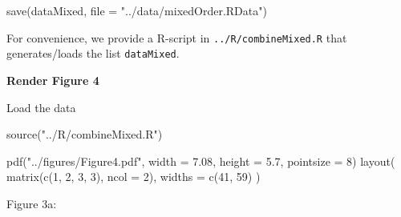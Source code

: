\documentclass[
]{article}
\newenvironment{Shaded}{\begin{snugshade}}{\end{snugshade}}
\newcommand{\AttributeTok}[1]{\textcolor[rgb]{0.77,0.63,0.00}{#1}}
\newcommand{\DecValTok}[1]{\textcolor[rgb]{0.00,0.00,0.81}{#1}}
\newcommand{\FloatTok}[1]{\textcolor[rgb]{0.00,0.00,0.81}{#1}}
\newcommand{\FunctionTok}[1]{\textcolor[rgb]{0.00,0.00,0.00}{#1}}
\newcommand{\NormalTok}[1]{#1}
\newcommand{\StringTok}[1]{\textcolor[rgb]{0.31,0.60,0.02}{#1}}
\begin{document}
\begin{Shaded}
\begin{Highlighting}[]
\FunctionTok{save}\NormalTok{(dataMixed, }\AttributeTok{file =} \StringTok{"../data/mixedOrder.RData"}\NormalTok{)}
\end{Highlighting}
\end{Shaded}

For convenience, we provide a R-script in \texttt{../R/combineMixed.R}
that generates/loads the list \texttt{dataMixed}.

\textbf{Render Figure 4}

Load the data

\begin{Shaded}
\begin{Highlighting}[]
\FunctionTok{source}\NormalTok{(}\StringTok{"../R/combineMixed.R"}\NormalTok{)}
\end{Highlighting}
\end{Shaded}

\begin{Shaded}
\begin{Highlighting}[]
\FunctionTok{pdf}\NormalTok{(}\StringTok{"../figures/Figure4.pdf"}\NormalTok{, }\AttributeTok{width =} \FloatTok{7.08}\NormalTok{, }\AttributeTok{height =} \FloatTok{5.7}\NormalTok{, }\AttributeTok{pointsize =} \DecValTok{8}\NormalTok{)}
\FunctionTok{layout}\NormalTok{(}
  \FunctionTok{matrix}\NormalTok{(}\FunctionTok{c}\NormalTok{(}\DecValTok{1}\NormalTok{, }\DecValTok{2}\NormalTok{, }\DecValTok{3}\NormalTok{, }\DecValTok{3}\NormalTok{), }\AttributeTok{ncol =} \DecValTok{2}\NormalTok{),}
  \AttributeTok{widths =} \FunctionTok{c}\NormalTok{(}\DecValTok{41}\NormalTok{, }\DecValTok{59}\NormalTok{)}
\NormalTok{)}
\end{Highlighting}
\end{Shaded}

Figure 3a:
\end{document}
